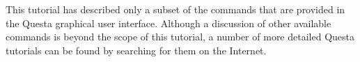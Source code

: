 \documentclass[11pt, twoside, pdftex]{article}
\newcommand{\commonPath}{../../../Common}
\begin{document}
\noindent
This tutorial has described only a subset of the commands that are provided in the
Questa graphical user interface. Although a discussion of other available commands is 
beyond the scope of this tutorial, a number of more detailed Questa tutorials can be 
found by searching for them on the Internet.



\end{document}
